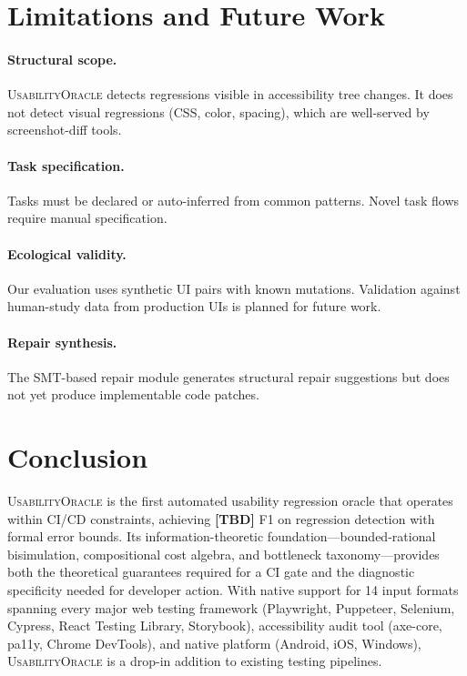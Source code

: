 \documentclass[11pt,twocolumn]{article}
\theoremstyle{definition}
\newcommand{\tool}{\textsc{UsabilityOracle}}
\begin{document}
\section{Limitations and Future Work}
\label{sec:limitations}

\paragraph{Structural scope.}
\tool{} detects regressions visible in accessibility tree changes.
It does not detect visual regressions (CSS, color, spacing), which are well-served by screenshot-diff tools.

\paragraph{Task specification.}
Tasks must be declared or auto-inferred from common patterns.
Novel task flows require manual specification.

\paragraph{Ecological validity.}
Our evaluation uses synthetic UI pairs with known mutations.
Validation against human-study data from production UIs is planned for future work.

\paragraph{Repair synthesis.}
The SMT-based repair module generates structural repair suggestions but does not yet produce implementable code patches.

\section{Conclusion}
\label{sec:conclusion}

\tool{} is the first automated usability regression oracle that operates within CI/CD constraints, achieving \textbf{[TBD]} F1 on regression detection with formal error bounds.
Its information-theoretic foundation---bounded-rational bisimulation, compositional cost algebra, and bottleneck taxonomy---provides both the theoretical guarantees required for a CI gate and the diagnostic specificity needed for developer action.
With native support for 14 input formats spanning every major web testing framework (Playwright, Puppeteer, Selenium, Cypress, React Testing Library, Storybook), accessibility audit tool (axe-core, pa11y, Chrome DevTools), and native platform (Android, iOS, Windows), \tool{} is a drop-in addition to existing testing pipelines.
\end{document}
